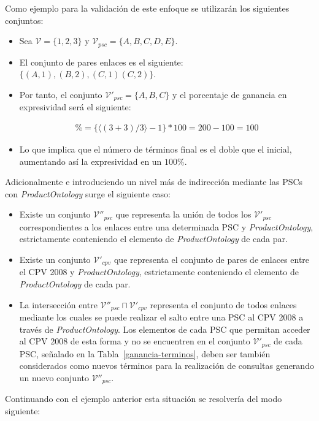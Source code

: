 Como ejemplo para la validación de este enfoque se utilizarán los siguientes conjuntos:
\begin{itemize}
 \item Sea $\mathcal{V} = \{ 1, 2, 3 \}$  y  $\mathcal{V}_{psc} = \{A, B, C, D, E\}$.
 \item El conjunto de pares enlaces es el siguiente: $\{ (A,1), (B,2), (C,1) (C,2) \}$.
 \item Por tanto, el conjunto $\mathcal{V'}_{psc} = \{A, B, C\}$ y el porcentaje de ganancia en expresividad será el siguiente:

\begin{align}
\% =  \{ \langle (3+3) / 3 \rangle -1 \} * 100  = 200 - 100 = 100 
\end{align}
\item Lo que implica que el número de términos final es el doble que el inicial, aumentando así la expresividad en un $100\%$.
\end{itemize}


Adicionalmente e introduciendo un nivel más de indirección mediante las \gls{PSC}s con \textit{ProductOntology} surge el siguiente caso:
\begin{itemize}
 \item Existe un conjunto $\mathcal{V''}_{psc}$ que representa la unión de todos los $\mathcal{V'}_{psc}$ correspondientes 
a los enlaces entre una determinada PSC y \textit{ProductOntology}, estrictamente conteniendo el elemento de \textit{ProductOntology} de cada par.
\item Existe un conjunto $\mathcal{V'}_{cpv}$ que representa el conjunto de pares de enlaces entre el \gls{CPV} 2008 y \textit{ProductOntology}, 
estrictamente conteniendo el elemento de \textit{ProductOntology} de cada par.
\item La intersección entre $\mathcal{V''}_{psc} \sqcap \mathcal{V'}_{cpv}$ representa el conjunto de todos enlaces mediante 
los cuales se puede realizar el salto entre una PSC al CPV 2008 a través de \textit{ProductOntology}. Los elementos 
de cada PSC que permitan acceder al CPV 2008 de esta forma y no se encuentren en el conjunto $\mathcal{V'}_{psc}$ de cada PSC, señalado 
en la Tabla~\ref{ganancia-terminos}, deben ser también considerados como nuevos términos para la realización de consultas generando 
un nuevo conjunto $\mathcal{V''}_{psc}$.
\end{itemize}

Continuando con el ejemplo anterior esta situación se resolvería del modo siguiente:

